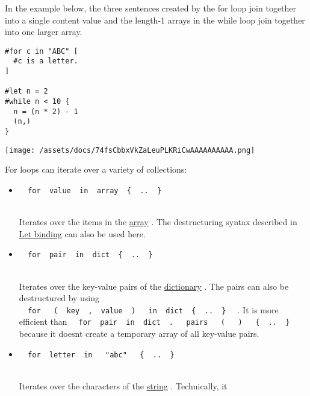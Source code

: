 In the example below, the three sentences created by the for loop join
together into a single content value and the length-1 arrays in the
while loop join together into one larger array.

\begin{verbatim}
#for c in "ABC" [
  #c is a letter.
]

#let n = 2
#while n < 10 {
  n = (n * 2) - 1
  (n,)
}
\end{verbatim}

\texttt{[image: /assets/docs/74fsCbbxVkZaLeuPLKRiCwAAAAAAAAAA.png]}

For loops can iterate over a variety of collections:

\begin{itemize}
\item
  \texttt{\ }{\texttt{\ for\ }}\texttt{\ value\ }{\texttt{\ in\ }}\texttt{\ array\ }{\texttt{\ \{\ }}\texttt{\ ..\ }{\texttt{\ \}\ }}\texttt{\ }\strut \\
  Iterates over the items in the
  \href{/docs/reference/foundations/array/}{array} . The destructuring
  syntax described in \href{/docs/reference/scripting/\#bindings}{Let
  binding} can also be used here.
\item
  \texttt{\ }{\texttt{\ for\ }}\texttt{\ pair\ }{\texttt{\ in\ }}\texttt{\ dict\ }{\texttt{\ \{\ }}\texttt{\ ..\ }{\texttt{\ \}\ }}\texttt{\ }\strut \\
  Iterates over the key-value pairs of the
  \href{/docs/reference/foundations/dictionary/}{dictionary} . The pairs
  can also be destructured by using
  \texttt{\ }{\texttt{\ for\ }}\texttt{\ }{\texttt{\ (\ }}\texttt{\ key\ }{\texttt{\ ,\ }}\texttt{\ value\ }{\texttt{\ )\ }}\texttt{\ }{\texttt{\ in\ }}\texttt{\ dict\ }{\texttt{\ \{\ }}\texttt{\ ..\ }{\texttt{\ \}\ }}\texttt{\ }
  . It is more efficient than
  \texttt{\ }{\texttt{\ for\ }}\texttt{\ pair\ }{\texttt{\ in\ }}\texttt{\ dict\ }{\texttt{\ .\ }}\texttt{\ }{\texttt{\ pairs\ }}\texttt{\ }{\texttt{\ (\ }}\texttt{\ }{\texttt{\ )\ }}\texttt{\ }{\texttt{\ \{\ }}\texttt{\ ..\ }{\texttt{\ \}\ }}\texttt{\ }
  because it doesn\textquotesingle t create a temporary array of all
  key-value pairs.
\item
  \texttt{\ }{\texttt{\ for\ }}\texttt{\ letter\ }{\texttt{\ in\ }}\texttt{\ }{\texttt{\ "abc"\ }}\texttt{\ }{\texttt{\ \{\ }}\texttt{\ ..\ }{\texttt{\ \}\ }}\texttt{\ }\strut \\
  Iterates over the characters of the
  \href{/docs/reference/foundations/str/}{string} . Technically, it

\end{itemize}
